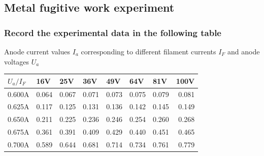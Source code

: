 \documentclass[UTF8]{article}
\begin{document}
\subsection{Metal fugitive work experiment}
\subsubsection{Record the experimental data in the following table}
Anode current values $I_a$ corresponding to different filament currents $I_F$ and anode voltages $U_a$
\begin{table}[htbp]
  \centering
    \begin{tabular}{lrrrrrrr}
        \toprule[2pt]
    $U_a/I_F$ & \multicolumn{1}{l}{16V} & \multicolumn{1}{l}{25V} & \multicolumn{1}{l}{36V} & \multicolumn{1}{l}{49V} & \multicolumn{1}{l}{64V} & \multicolumn{1}{l}{81V} & \multicolumn{1}{l}{100V} \\
        \midrule
    0.600A & 0.064 & 0.067 & 0.071 & 0.073 & 0.075 & 0.079 & 0.081 \\
    0.625A & 0.117 & 0.125 & 0.131 & 0.136 & 0.142 & 0.145 & 0.149 \\
    0.650A & 0.211 & 0.225 & 0.236 & 0.246 & 0.254 & 0.260  & 0.268 \\
    0.675A & 0.361 & 0.391 & 0.409 & 0.429 & 0.440  & 0.451 & 0.465 \\
    0.700A & 0.589 & 0.644 & 0.681 & 0.714 & 0.734 & 0.761 & 0.779 \\
      \bottomrule[2pt]
    \end{tabular}%
  \label{tab:addlabel}%
\end{table}%
\end{document}

